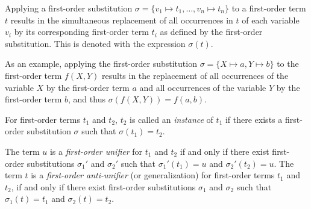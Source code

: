 \begin{defn}\label{def:substitution}
Applying a first-order substitution $\sigma = \{v_1 \mapsto t_1, \ldots, v_n \mapsto t_n\}$ to a first-order term $t$ results in the simultaneous replacement of all occurrences in $t$ of each variable $v_i$ by its corresponding first-order term $t_i$ as defined by the first-order substitution. This is denoted with the expression $\sigma(t)$.
\end{defn}

As an example, applying the first-order substitution $\sigma = \{X \mapsto a, Y \mapsto b\}$
to the first-order term $f(X,Y)$ results in the replacement of all occurrences of the variable $X$ by the first-order term $a$ and all occurrences of the variable $Y$ by the first-order term $b$, and thus $\sigma(f(X,Y)) = f(a,b)$.

\begin{defn}\label{def:instance}
For first-order terms $t_1$ and $t_2$, $t_2$ is called an \emph{instance} of $t_1$ if there exists a first-order substitution $\sigma$ such that $\sigma(t_1) = t_2$.
\end{defn}



\begin{defn}\label{def:generalization}
The term $u$ is a \emph{first-order unifier} for $t_1$ and $t_2$ if and only if there exist first-order substitutions $\sigma_1'$ and $\sigma_2'$ such that $\sigma_1'(t_1)=u$ and $\sigma_2'(t_2)=u$.  The term $t$ is a \emph{first-order anti-unifier} (or generalization) for first-order terms $t_1$ and $t_2$, if and only if there exist first-order substitutions $\sigma_1$ and $\sigma_2$ such that $\sigma_1(t)=t_1$ and $\sigma_2(t)=t_2$.
\end{defn}

